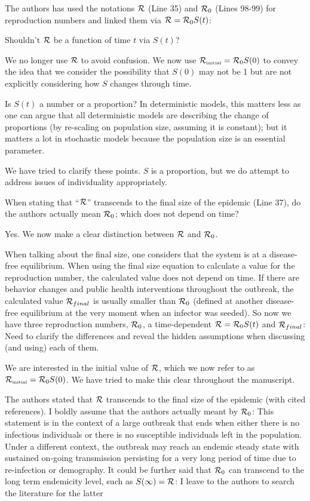 \documentclass[12pt]{article}
\newcommand{\RR}{\ensuremath{{\cal R}}}
\newcommand{\Rx}[1]{\ensuremath{{\cal R}_{#1}}}
\newcommand{\Ro}{\Rx{0}}
\newcommand{\Rini}{\Rx{\textrm{\tiny initial}}}
\newcommand{\revtext}{\textsf}
\begin{document}
\revtext{The authors has used the notations $\RR$ (Line 35) and $\Ro$ (Lines 98-99) for reproduction numbers and
linked them via $\RR = \Ro S(t)$:}

\revtext{Shouldn't $\RR$ be a function of time $t$ via $S(t)$?}

We no longer use $\RR$ to avoid confusion. We now use $\Rini = \Ro S(0)$ to convey the idea that we consider the possibility that $S(0)$ may not be 1 but are not explicitly considering how $S$ changes through time.

\revtext{Is $S(t)$ a number or a proportion? In deterministic models, this matters
less as one can argue that all deterministic models are describing the
change of proportions (by re-scaling on population size, assuming it is
constant); but it matters a lot in stochastic models because the population
size is an essential parameter.}

We have tried to clarify these points. $S$ is a proportion, but we do attempt to address issues of individuality appropriately.

\revtext{
When stating that ``$\RR$'' transcends to the final size of the epidemic (Line
37), do the authors actually mean $\Ro$; which does not depend on time?
}

Yes. We now make a clear distinction between $\RR$ and $\Ro$.

\revtext{
When talking about the final size, one considers that the system is at a
disease-free equilibrium. When using the final size equation to calculate a
value for the reproduction number, the calculated value does not depend
on time. If there are behavior changes and public health interventions
throughout the outbreak, the calculated value $\RR_{final}$ is usually smaller
than $\Ro$ (defined at another disease-free equilibrium at the very moment
when an infector was seeded). So now we have three reproduction numbers, $\Ro$, a time-dependent $\RR = \Ro S(t)$ and $\RR_{final}$: Need to clarify the differences and reveal the hidden assumptions when discussing (and using)
each of them.
}

We are interested in the initial value of $\RR$, which we now refer to as $\Rini = \Ro S(0)$. We have tried to make this clear throughout the manuscript.

\revtext{
The authors stated that $\RR$ transcends to the final size of the epidemic
(with cited references). I boldly assume that the authors actually meant
by $\Ro$: This statement is in the context of a large outbreak that ends
when either there is no infectious individuals or there is no susceptible
individuals left in the population. Under a different context, the outbreak
may reach an endemic steady state with sustained on-going transmission
persisting for a very long period of time due to re-infection or demography.
It could be further said that $\Ro$ can transcend to the long term endemicity
level, such as $S(\infty) = \RR$: I leave to the authors to search the literature
for the latter
}
\end{document}
